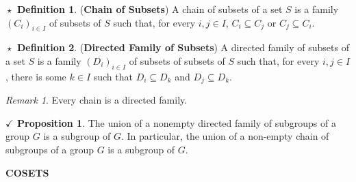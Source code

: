 \documentclass{article}
\theoremstyle{definition}
\newtheorem{definition}{$\boxed{\star}$ Definition}
\theoremstyle{remark}
\newtheorem*{remark}{Remark}
\theoremstyle{definition}
\theoremstyle{definition}
\newtheorem{proposition}{$\checkmark$ Proposition}
\theoremstyle{definition}
\theoremstyle{proof}
\begin{document}
\hrulefill
\begin{definition} 
	(\textbf{Chain of Subsets}) A chain of subsets of a set $ S $ is a family $ (C_i)_{i\in I} $ of subsets of $ S $ such that, for every $ i,j \in I $, $ C_i \subseteq C_j $ or $ C_j \subseteq C_i $.
\end{definition}
\begin{definition}
	(\textbf{Directed Family of Subsets}) A directed family of subsets of a set $ S $ is a family $ (D_i)_{i\in I} $ of subsets of subsets of $ S $ such that, for every $ i,j \in I $, there is some $ k \in I $ such that $ D_i \subseteq D_k $ and $ D_j \subseteq D_k $.
\end{definition}
\begin{remark}
	Every chain is a directed family.
\end{remark}
\hrulefill
\begin{proposition}
	The union of a nonempty directed family of subgroups of a group $ G $ is a subgroup of $ G $. In particular, the union of a non-empty chain of subgroups of a group $ G $ is a subgroup of $ G $.
\end{proposition}
\hrulefill
\textbf{COSETS}
\hrulefill
\end{document}
